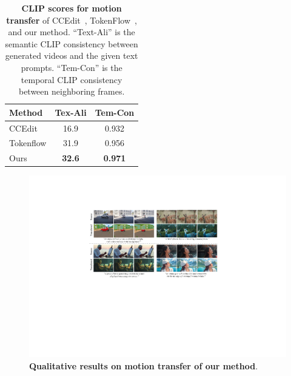 \begin{table}[]
\centering
\begin{tabular}{lcc}
\hline
Method                           & \multicolumn{1}{c}{Tex-Ali} $\uparrow$ & \multicolumn{1}{c}{Tem-Con} $\uparrow$ \\ \hline
CCEdit                           & 16.9& 0.932 \\
Tokenflow                        & 31.9& 0.956 \\
Ours                             & \textbf{32.6}& \textbf{0.971} \\
\hline
\end{tabular}
\caption{\textbf{CLIP scores for motion transfer} of CCEdit~\cite{ccedit}, TokenFlow~\cite{tokenflow}, and our method. ``Text-Ali'' is the semantic CLIP consistency between generated videos and the given text prompts. ``Tem-Con'' is the temporal CLIP consistency between neighboring frames.}
\vspace{-15pt}
\label{tab:motion}
\end{table}


\begin{figure}[htbp]
    \centering
    \includegraphics[width=\textwidth]{pictures/v2v1.pdf}
    \caption{\textbf{Qualitative results on motion transfer of our method}.}
    \label{fig:v2v1}
\end{figure}

